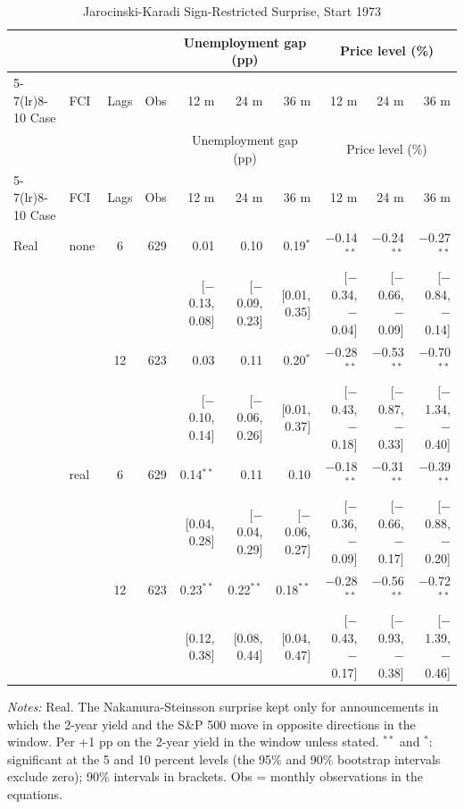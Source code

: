 \begingroup\scriptsize\setlength{\tabcolsep}{0.9pt}
\begin{longtable}{llcrrrrrrr}
\caption{Jarocinski-Karadi Sign-Restricted Surprise, Start 1973}\label{tab:appA373}\\
\toprule
 & & & & \multicolumn{3}{c}{Unemployment gap (pp)} & \multicolumn{3}{c}{Price level (\%)}\\ \cmidrule(lr){5-7}\cmidrule(lr){8-10}
Case & FCI & Lags & Obs & 12 m & 24 m & 36 m & 12 m & 24 m & 36 m\\
\midrule\endfirsthead
\toprule
 & & & & \multicolumn{3}{c}{Unemployment gap (pp)} & \multicolumn{3}{c}{Price level (\%)}\\ \cmidrule(lr){5-7}\cmidrule(lr){8-10}
Case & FCI & Lags & Obs & 12 m & 24 m & 36 m & 12 m & 24 m & 36 m\\
\midrule\endhead
\bottomrule\endfoot
Real & none & 6 & 629 & 0.01 & 0.10 & 0.19$^{*}$ & $-$0.14$^{**}$ & $-$0.24$^{**}$ & $-$0.27$^{**}$\\
 & & & & {\scriptsize [$-$0.13, 0.08]} & {\scriptsize [$-$0.09, 0.23]} & {\scriptsize [0.01, 0.35]} & {\scriptsize [$-$0.34, $-$0.04]} & {\scriptsize [$-$0.66, $-$0.09]} & {\scriptsize [$-$0.84, $-$0.14]}\\
 &  & 12 & 623 & 0.03 & 0.11 & 0.20$^{*}$ & $-$0.28$^{**}$ & $-$0.53$^{**}$ & $-$0.70$^{**}$\\
 & & & & {\scriptsize [$-$0.10, 0.14]} & {\scriptsize [$-$0.06, 0.26]} & {\scriptsize [0.01, 0.37]} & {\scriptsize [$-$0.43, $-$0.18]} & {\scriptsize [$-$0.87, $-$0.33]} & {\scriptsize [$-$1.34, $-$0.40]}\\
 & real & 6 & 629 & 0.14$^{**}$ & 0.11 & 0.10 & $-$0.18$^{**}$ & $-$0.31$^{**}$ & $-$0.39$^{**}$\\
 & & & & {\scriptsize [0.04, 0.28]} & {\scriptsize [$-$0.04, 0.29]} & {\scriptsize [$-$0.06, 0.27]} & {\scriptsize [$-$0.36, $-$0.09]} & {\scriptsize [$-$0.66, $-$0.17]} & {\scriptsize [$-$0.88, $-$0.20]}\\
 &  & 12 & 623 & 0.23$^{**}$ & 0.22$^{**}$ & 0.18$^{**}$ & $-$0.28$^{**}$ & $-$0.56$^{**}$ & $-$0.72$^{**}$\\
 & & & & {\scriptsize [0.12, 0.38]} & {\scriptsize [0.08, 0.44]} & {\scriptsize [0.04, 0.47]} & {\scriptsize [$-$0.43, $-$0.17]} & {\scriptsize [$-$0.93, $-$0.38]} & {\scriptsize [$-$1.39, $-$0.46]}\\
\end{longtable}
\begin{flushleft}\footnotesize\textit{Notes:} Real. The Nakamura-Steinsson surprise kept only for announcements in which the 2-year yield and the S\&P 500 move in opposite directions in the window. Per +1 pp on the 2-year yield in the window unless stated. $^{**}$ and $^{*}$: significant at the 5 and 10 percent levels (the 95\% and 90\% bootstrap intervals exclude zero); 90\% intervals in brackets. Obs = monthly observations in the equations.\end{flushleft}
\endgroup
